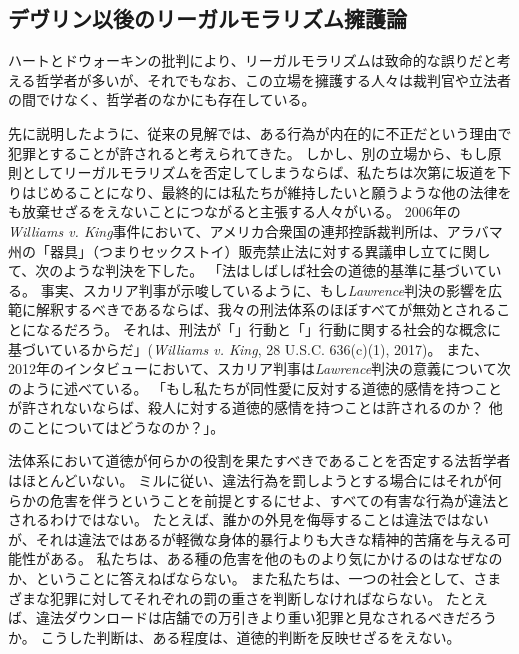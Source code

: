 \documentclass[paper=a4,book,openany]{jlreq}
\newcommand{\ig}[1]{}           %
\begin{document}
\subsection{デヴリン以後のリーガルモラリズム擁護論}

ハートとドウォーキン\ig{Ronald Dworkin}の批判により、リーガルモラリズムは致命的な誤りだと考える哲学者が多いが、それでもなお、この立場を擁護する人々は裁判官や立法者の間でけなく、哲学者のなかにも存在している。

先に説明したように、従来の見解では、ある行為が内在的に不正だという理由で犯罪とすることが許されると考えられてきた。
しかし、別の立場から、もし原則としてリーガルモラリズムを否定してしまうならば、私たちは次第に坂道を下りはじめることになり、最終的には私たちが維持したいと願うような他の法律をも放棄せざるをえないことにつながると主張する人々がいる。
2006年の\emph{Williams v. King}事件において、アメリカ合衆国の連邦控訴裁判所は、アラバマ州の「器具」（つまりセックストイ）販売禁止法に対する異議申し立てに関して、次のような判決を下した。
「法はしばしば社会の道徳的基準に基づいている。
事実、スカリア判事が示唆しているように、もし\emph{Lawrence}判決の影響を広範に解釈するべきであるならば、我々の刑法体系のほぼすべてが無効とされることになるだろう。
それは、刑法が「」行動と「」行動に関する社会的な概念に基づいているからだ」(\emph{Williams v. King}, 28 U.S.C. 636(c)(1), 2017)。
また、2012年のインタビューにおいて、スカリア判事は\emph{Lawrence}判決の意義について次のように述べている。
「もし私たちが同性愛に反対する道徳的感情を持つことが許されないならば、殺人に対する道徳的感情を持つことは許されるのか？ 他のことについてはどうなのか？」\citep{sink12:_justic_scalia_defen_compar_laws_homos_murder}。

法体系において道徳が何らかの役割を果たすべきであることを否定する法哲学者はほとんどいない。
ミルに従い、違法行為を罰しようとする場合にはそれが何らかの危害を伴うということを前提とするにせよ、すべての有害な行為が違法とされるわけではない。
たとえば、誰かの外見を侮辱することは違法ではないが、それは違法ではあるが軽微な身体的暴行よりも大きな精神的苦痛を与える可能性がある。
私たちは、ある種の危害を他のものより気にかけるのはなぜなのか、ということに答えねばならない。
また私たちは、一つの社会として、さまざまな犯罪に対してそれぞれの罰の重さを判断しなければならない。
たとえば、違法ダウンロードは店舗での万引きより重い犯罪と見なされるべきだろうか。
こうした判断は、ある程度は、道徳的判断を反映せざるをえない。
\end{document}
